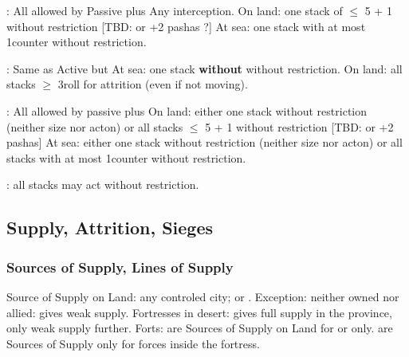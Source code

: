\ducats: All allowed by Passive plus
\bparag Any interception.
\bparag On land: one stack of $\leq$ 5 \LD + 1 \Pasha without restriction
[TBD: or +2 pashas ?]
\bparag At sea: one stack with at most 1\FLEET counter without restriction.

\ducats: Same as Active but
\bparag At sea: one stack \textbf{without} \FLEET without restriction.
\bparag On land: all stacks $\geq$ 3\LD roll for attrition (even if not moving).

\ducats: All allowed by passive plus
\bparag On land: either one stack without restriction (neither size nor acton)
or all stacks $\leq$ 5 \LD + 1 \Pasha without restriction  [TBD: or +2 pashas]
\bparag At sea: either one stack without restriction (neither size nor acton)
or all stacks with at most 1\FLEET counter without restriction.

\ducats: all stacks may act without restriction.


\subsection{Supply, Attrition, Sieges}
\subsubsection{Sources of Supply, Lines of Supply}

\bparag Source of Supply on Land: any controled city; \TP or \COL.  Exception:
neither owned nor allied: gives weak supply.  Fortresses in desert: gives full
supply in the province, only weak supply further.
\bparag Forts: are Sources of Supply on Land for \LD or \LDE only.
\bparag \Presidios are Sources of Supply only for forces inside the fortress.

